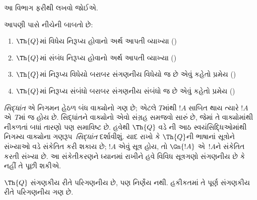 
\label{guunit:OLP-0302}


\begin{editorial}
આ વિભાગ ફરીથી લખવો જોઈએ.
\end{editorial}

આપણી પાસે નીચેની બાબતો છે:
\begin{enumerate}
\item $\Th{Q}$માં વિધેય નિરૂપ્ય
  હોવાનો અર્થ આપતી વ્યાખ્યા
  ()
\item $\Th{Q}$માં સંબંધ નિરૂપ્ય
  હોવાનો અર્થ આપતી વ્યાખ્યા
  ()
\item $\Th{Q}$માં નિરૂપ્ય વિધેયો
  બરાબર સંગણનીય વિધેયો જ છે
  એવું કહેતો પ્રમેય
  ()
\item $\Th{Q}$માં નિરૂપ્ય સંબંધો
  બરાબર સંગણનીય સંબંધો જ છે
  એવું કહેતો પ્રમેય
  ()
\end{enumerate}

\emph{સિદ્ધાંત} એ નિગમન હેઠળ
બંધ વાક્યોનો ગણ છે; એટલે
$T$માંથી $!A$ સાબિત થાય
ત્યારે $!A$ એ~$T$માં જ
હોય છે. સિદ્ધાંતને વાક્યોનો
એવો સંગ્રહ સમજવો સારું છે,
જેમાં તે વાક્યોમાંથી નીકળતાં
બધાં તારણો પણ સમાવિષ્ટ છે.
હવેથી $\Th{Q}$ વડે
ની
આઠ સ્વયંસિદ્ધિઓમાંથી નિગમ્ય
વાક્યોના ગણરૂપ~\emph{સિદ્ધાંત}
દર્શાવીશું. યાદ રાખો કે
$\Th{Q}$ની ભાષાનાં સૂત્રોને
સંખ્યાઓ વડે સંકેતિત કરી
શકાય છે; $!A$ એવું સૂત્ર
હોય, તો $\Gn{!A}$ એ~$!A$ને
સંકેતિત કરતી સંખ્યા છે.
આ સંકેતીકરણને ધ્યાનમાં રાખીને
હવે વિવિધ સૂત્રગણો સંગણનીય
છે કે નહીં તે પૂછી શકીએ.
\endgroup


\begingroup
\makeatletter{}\makeatother


\label{guunit:OLP-0303}



\begin{thm}
$\Th{Q}$ સંગણકીય રીતે પરિગણનીય છે,
પણ નિર્ણેય નથી. હકીકતમાં તે
પૂર્ણ સંગણકીય રીતે પરિગણનીય ગણ છે.
\end{thm}

